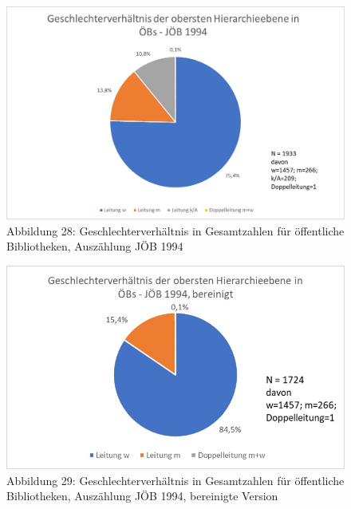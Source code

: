 \documentclass[a4paper,
fontsize=11pt,
oneside,
numbers=noperiodatend,
parskip=half-,
bibliography=totoc,
final
]{scrartcl}
\begin{document}
\begin{figure}
\centering
\includegraphics{img/Abb_28_JOB-1994_gesamt.jpg}
\caption{Abbildung 28: Geschlechterverhältnis in Gesamtzahlen für
öffentliche Bibliotheken, Auszählung JÖB 1994}
\end{figure}

\begin{figure}
\centering
\includegraphics{img/Abb_29_JOB-1994_gesamt_bereinigt.jpg}
\caption{Abbildung 29: Geschlechterverhältnis in Gesamtzahlen für
öffentliche Bibliotheken, Auszählung JÖB 1994, bereinigte Version}
\end{figure}
\end{document}
